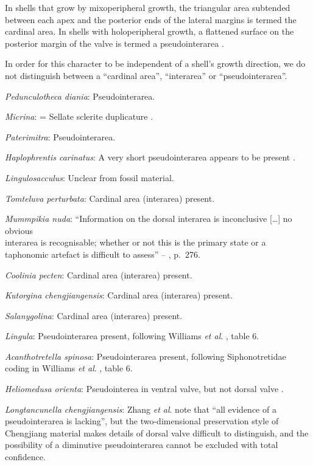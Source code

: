 \documentclass[openany]{book}
\theoremstyle{definition}
\theoremstyle{definition}
\theoremstyle{definition}
\theoremstyle{remark}
\begin{document}
In shells that grow by mixoperipheral growth, the triangular area
subtended between each apex and the posterior ends of the lateral
margins is termed the cardinal area. In shells with holoperipheral
growth, a flattened surface on the posterior margin of the valve is
termed a pseudointerarea
\citep[paraphrasing][]{Williams1997BrachiopodaRevised}.

In order for this character to be independent of a shell's growth
direction, we do not distinguish between a ``cardinal area'',
``interarea'' or ``pseudointerarea''.

\emph{Pedunculotheca diania}: Pseudointerarea.

\emph{Micrina}: = Sellate sclerite duplicature
\citep{Holmer2008TheEarly}.

\emph{Paterimitra}: Pseudointerarea.

\emph{Haplophrentis carinatus}: A very short pseudointerarea appears to
be present \citep{Moysiuk2017Hyolithsare}.

\emph{Lingulosacculus}: Unclear from fossil material.

\emph{Tomteluva perturbata}: Cardinal area (interarea) present.

\emph{Mummpikia nuda}: ``Information on the dorsal interarea is
inconclusive {[}\ldots{}{]} no obvious\\
interarea is recognisable; whether or not this is the primary state or a
taphonomic artefact is difficult to assess'' --
\citet{Balthasar2008iMummpikia}, p.~276.

\emph{Coolinia pecten}: Cardinal area (interarea) present.

\emph{Kutorgina chengjiangensis}: Cardinal area (interarea) present.

\emph{Salanygolina}: Cardinal area (interarea) present.

\emph{Lingula}: Pseudointerarea present, following Williams \emph{et
al}. \citeyearpar{Williams2000BrachiopodaLinguliformea}, table 6.

\emph{Acanthotretella spinosa}: Pseudointerarea present, following
Siphonotretidae coding in Williams \emph{et al}.
\citeyearpar{Williams2000BrachiopodaLinguliformea}, table 6.

\emph{Heliomedusa orienta}: Pseudointerea in ventral valve, but not
dorsal valve \citep[2007]{Williams2000BrachiopodaLinguliformea}.

\emph{Longtancunella chengjiangensis}: Zhang \emph{et al}.
\citeyearpar{Zhang2011Theexceptionally} note that ``all evidence of a
pseudointerarea is lacking'', but the two-dimensional preservation style
of Chengjiang material makes details of dorsal valve difficult to
distinguish, and the possibility of a diminutive pseudointerarea cannot
be excluded with total confidence.
\end{document}
